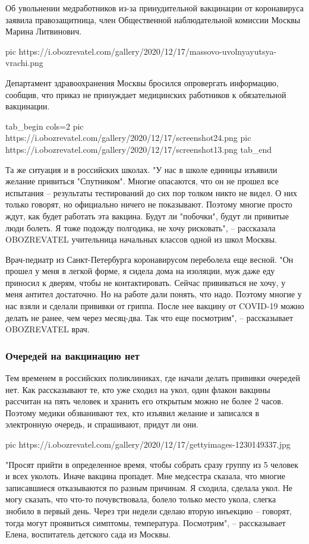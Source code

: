 Об увольнении медработников из-за принудительной вакцинации от коронавируса
заявила правозащитница, член Общественной наблюдательной комиссии Москвы Марина
Литвинович.

\ifcmt
pic https://i.obozrevatel.com/gallery/2020/12/17/massovo-uvolnyayutsya-vrachi.png
\fi

Департамент здравоохранения Москвы бросился опровергать информацию, сообщив,
что приказ не принуждает медицинских работников к обязательной вакцинации.

\ifcmt
tab_begin cols=2
	pic https://i.obozrevatel.com/gallery/2020/12/17/screenshot24.png
	pic https://i.obozrevatel.com/gallery/2020/12/17/screenshot13.png
tab_end
\fi

Та же ситуация и в российских школах. "У нас в школе единицы изъявили желание
привиться "Спутником". Многие опасаются, что он не прошел все испытания –
результаты тестирований до сих пор толком никто не видел. О них только говорят,
но официально ничего не показывают. Поэтому многие просто ждут, как будет
работать эта вакцина. Будут ли "побочки", будут ли привитые люди болеть. Я тоже
подожду полгодика, не хочу рисковать", – рассказала OBOZREVATEL учительница
начальных классов одной из школ Москвы.

Врач-педиатр из Санкт-Петербурга коронавирусом переболела еще весной. "Он
прошел у меня в легкой форме, я сидела дома на изоляции, муж даже еду приносил
к дверям, чтобы не контактировать. Сейчас прививаться не хочу, у меня антител
достаточно. Но на работе дали понять, что надо. Поэтому многие у нас взяли и
сделали прививки от гриппа. После нее вакцину от COVID-19 можно делать не
ранее, чем через месяц-два. Так что еще посмотрим", – рассказывает OBOZREVATEL
врач.

\subsubsection{Очередей на вакцинацию нет}

Тем временем в российских поликлиниках, где начали делать прививки очередей
нет. Как рассказывают те, кто уже сходил на укол, один флакон вакцины рассчитан
на пять человек и хранить его открытым можно не более 2 часов. Поэтому медики
обзванивают тех, кто изъявил желание и записался в электронную очередь, и
спрашивают, придут ли они.

\ifcmt
pic https://i.obozrevatel.com/gallery/2020/12/17/gettyimages-1230149337.jpg
\fi

"Просят прийти в определенное время, чтобы собрать сразу группу из 5 человек и
всех уколоть. Иначе вакцина пропадет. Мне медсестра сказала, что многие
записавшиеся отказываются по разным причинам. Я сходила, сделала укол. Не могу
сказать, что что-то почувствовала, болело только место укола, слегка знобило в
первый день. Через три недели сделаю вторую инъекцию – говорят, тогда могут
проявиться симптомы, температура. Посмотрим", – рассказывает Елена, воспитатель
детского сада из Москвы.

